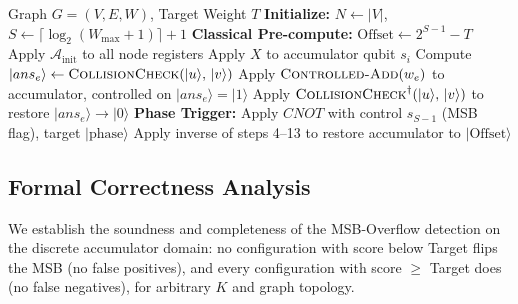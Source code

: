 \documentclass{ieeeaccess}
\begin{document}
\begin{algorithm}[h!]
\caption{Continuous MSB-Overflow Oracle Synthesis}\label{alg:oracle}
\begin{algorithmic}[1]
\REQUIRE Graph $G=(V,E,W)$, Target Weight $T$
\STATE \textbf{Initialize:} $N \leftarrow |V|$, $S \leftarrow \lceil \log_2(W_{\max} + 1) \rceil + 1$
\STATE \textbf{Classical Pre-compute:} $\text{Offset} \leftarrow 2^{S-1} - T$
\STATE Apply $\mathcal{A}_{\text{init}}$ to all node registers
        \STATE Apply $X$ to accumulator qubit $s_i$
    \ENDIF
\ENDFOR
{}
    \STATE {}
    \STATE Compute $|{ans}_e\rangle \leftarrow \textsc{CollisionCheck}(|u\rangle,\,|v\rangle)$
    \STATE {}
    \STATE Apply $\textsc{Controlled-Add}(w_e)$ to accumulator,
           controlled on $|{ans}_e\rangle = |1\rangle$
    \STATE {}
    \STATE Apply $\textsc{CollisionCheck}^{\dagger}(|u\rangle,\,|v\rangle)$
           to restore $|{ans}_e\rangle \rightarrow |0\rangle$
\ENDFOR
\STATE \textbf{Phase Trigger:}
       Apply $CNOT$ with control $s_{S-1}$ (MSB flag), target $|\text{phase}\rangle$
\STATE Apply inverse of steps 4--13 to restore accumulator to $|\text{Offset}\rangle$
\end{algorithmic}
\end{algorithm}


\subsection{Formal Correctness Analysis}
\label{sec:formal_proofs}

We establish the soundness and completeness of the MSB-Overflow detection on the discrete accumulator domain: no configuration with score below Target flips the MSB (no false positives), and every configuration with score $\ge$ Target does (no false negatives), for arbitrary $K$ and graph topology.
\end{document}
